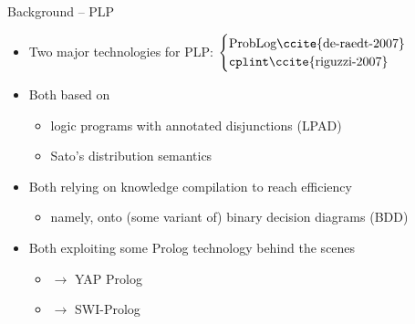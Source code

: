 \documentclass[presentation]{beamer}\mode<presentation>{\usetheme{AMSBolognaFC}}
\begin{document}
\begin{frame}[c]{Background -- PLP}

    \begin{itemize}
        \item Two major technologies for PLP: $\begin{cases}
            \text{\problog\ccite{de-raedt-2007}}
            \\
            \text{\cplint\ccite{riguzzi-2007}}
        \end{cases}$

        \bigskip

        \item Both based on
        \begin{itemize}
            \item logic programs with annotated disjunctions (\alert{LPAD})

            \item Sato's \alert{distribution semantics}
        \end{itemize}

        \bigskip

        \item Both relying on \alert{knowledge compilation} to reach efficiency
        \begin{itemize}
            \item namely, onto (some variant of) binary decision diagrams (\alert{BDD})
        \end{itemize}

        \bigskip

        \item Both exploiting some \alert{Prolog technology} behind the scenes
        \begin{itemize}
            \item \problog{} $\longrightarrow$ YAP Prolog
            \item \cplint{} $\longrightarrow$ SWI-Prolog
        \end{itemize}

    \end{itemize}

\end{frame}
\end{document}
